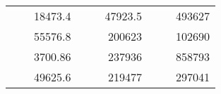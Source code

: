 \begin{table}[]
\begin{tabular}{|ccrccrccc}
\rowcolor[HTML]{DDFDFF} 
\multicolumn{1}{|c|}{\cellcolor[HTML]{FFFFC7}}                                & \multicolumn{1}{c|}{\cellcolor[HTML]{DDFDFF}}                      & \multicolumn{1}{r|}{\cellcolor[HTML]{DAE8FC}18473.4}   & \multicolumn{1}{c|}{\cellcolor[HTML]{FFFFC7}}                                & \multicolumn{1}{c|}{\cellcolor[HTML]{DDFDFF}}                       & \multicolumn{1}{r|}{\cellcolor[HTML]{DDFDFF}47923.5}   & \multicolumn{1}{c|}{\cellcolor[HTML]{FFFFC7}}                                & \multicolumn{1}{c|}{\cellcolor[HTML]{DDFDFF}}                      & \multicolumn{1}{r|}{\cellcolor[HTML]{DDFDFF}493627}    \\ \cline{3-3} \cline{6-6} \cline{9-9} 
\multicolumn{1}{|c|}{\cellcolor[HTML]{FFFFC7}}                                & \multicolumn{1}{c|}{\cellcolor[HTML]{DDFDFF}}                      & \multicolumn{1}{r|}{\cellcolor[HTML]{DDFDFF}55576.8}   & \multicolumn{1}{c|}{\cellcolor[HTML]{FFFFC7}}                                & \multicolumn{1}{c|}{\cellcolor[HTML]{DDFDFF}}                       & \multicolumn{1}{r|}{\cellcolor[HTML]{DAE8FC}200623}    & \multicolumn{1}{c|}{\cellcolor[HTML]{FFFFC7}}                                & \multicolumn{1}{c|}{\cellcolor[HTML]{DDFDFF}}                      & \multicolumn{1}{r|}{\cellcolor[HTML]{DAE8FC}102690}    \\ \cline{3-3} \cline{6-6} \cline{9-9} 
\rowcolor[HTML]{DDFDFF} 
\multicolumn{1}{|c|}{\cellcolor[HTML]{FFFFC7}}                                & \multicolumn{1}{c|}{\cellcolor[HTML]{DDFDFF}}                      & \multicolumn{1}{r|}{\cellcolor[HTML]{DAE8FC}3700.86}   & \multicolumn{1}{c|}{\cellcolor[HTML]{FFFFC7}}                                & \multicolumn{1}{c|}{\cellcolor[HTML]{DDFDFF}}                       & \multicolumn{1}{r|}{\cellcolor[HTML]{DDFDFF}237936}    & \multicolumn{1}{c|}{\cellcolor[HTML]{FFFFC7}}                                & \multicolumn{1}{c|}{\cellcolor[HTML]{DDFDFF}}                      & \multicolumn{1}{r|}{\cellcolor[HTML]{DDFDFF}858793}    \\ \cline{3-3} \cline{6-6} \cline{9-9} 
\multicolumn{1}{|c|}{\cellcolor[HTML]{FFFFC7}}                                & \multicolumn{1}{c|}{\cellcolor[HTML]{DDFDFF}}                      & \multicolumn{1}{r|}{\cellcolor[HTML]{DDFDFF}49625.6}   & \multicolumn{1}{c|}{\cellcolor[HTML]{FFFFC7}}                                & \multicolumn{1}{c|}{\cellcolor[HTML]{DDFDFF}}                       & \multicolumn{1}{r|}{\cellcolor[HTML]{DAE8FC}219477}    & \multicolumn{1}{c|}{\cellcolor[HTML]{FFFFC7}}                                & \multicolumn{1}{c|}{\cellcolor[HTML]{DDFDFF}}                      & \multicolumn{1}{r|}{\cellcolor[HTML]{DAE8FC}297041}    \\ \cline{3-3} \cline{6-6} \cline{9-9} 

\end{tabular}
\end{table}
